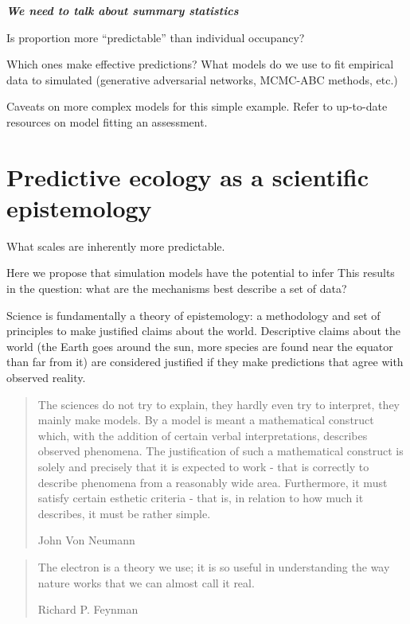 \documentclass[11pt]{article}
\begin{document}
\textbf{\emph{We need to talk about summary statistics}}

Is proportion more ``predictable'' than individual occupancy?

Which ones make effective predictions? What models do we use to fit
empirical data to simulated (generative adversarial networks, MCMC-ABC
methods, etc.)

Caveats on more complex models for this simple example. Refer to
up-to-date resources on model fitting an assessment.

\hypertarget{predictive-ecology-as-a-scientific-epistemology}{%
\section{Predictive ecology as a scientific
epistemology}\label{predictive-ecology-as-a-scientific-epistemology}}

What scales are inherently more predictable.

Here we propose that simulation models have the potential to infer This
results in the question: what are the mechanisms best describe a set of
data?

Science is fundamentally a theory of epistemology: a methodology and set
of principles to make justified claims about the world. Descriptive
claims about the world (the Earth goes around the sun, more species are
found near the equator than far from it) are considered justified if
they make predictions that agree with observed reality.

\begin{quote}
The sciences do not try to explain, they hardly even try to interpret,
they mainly make models. By a model is meant a mathematical construct
which, with the addition of certain verbal interpretations, describes
observed phenomena. The justification of such a mathematical construct
is solely and precisely that it is expected to work - that is correctly
to describe phenomena from a reasonably wide area. Furthermore, it must
satisfy certain esthetic criteria - that is, in relation to how much it
describes, it must be rather simple.

John Von Neumann
\end{quote}

\begin{quote}
The electron is a theory we use; it is so useful in understanding the
way nature works that we can almost call it real.

Richard P. Feynman
\end{quote}
\end{document}
